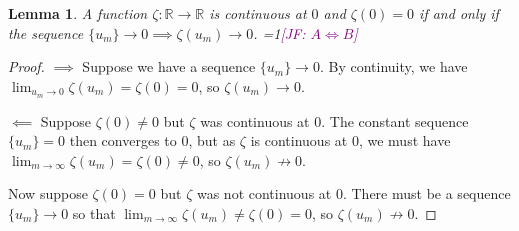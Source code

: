 \documentclass{article}
\newcommand{\Comments}{1}
\newcommand{\mynote}[2]{\ifnum\Comments=1\textcolor{#1}{#2}\fi}
\newcommand{\jessie}[1]{\mynote{purple}{[JF: #1]}}
\newcommand{\reals}{\mathbb{R}}
\newtheorem{lemma}{Lemma}
\begin{document}
\begin{lemma}\label{lem:continuous-iff-limits}
	A function $\zeta:\reals \to \reals$ is continuous at $0$ and $\zeta(0) = 0$ if and only if the sequence $\{u_m\} \to 0 \implies \zeta(u_m) \to 0$.
	\jessie{$A \iff B$}
\end{lemma}
\begin{proof}
	$\implies$ Suppose we have a sequence $\{u_m\} \to 0$.
	By continuity, we have $\lim_{u_m \to 0}\zeta(u_m) = \zeta(0) = 0$, so $\zeta(u_m) \to 0$.
	
	$\impliedby$ Suppose $\zeta(0) \neq 0$ but $\zeta$ was continuous at $0$.
	The constant sequence $\{u_m\} = 0$ then converges to $0$, but as $\zeta$ is continuous at $0$, we must have $\lim_{m \to \infty}\zeta(u_m) = \zeta(0) \neq 0$, so $\zeta(u_m) \not \to 0$.
	
	Now suppose $\zeta(0) = 0$ but $\zeta$ was not continuous at $0$.
	There must be a sequence $\{u_m\} \to 0$ so that $\lim_{m \to \infty}\zeta(u_m) \neq \zeta(0) = 0$, so $\zeta(u_m) \not \to 0$.
\end{proof}
\end{document}
